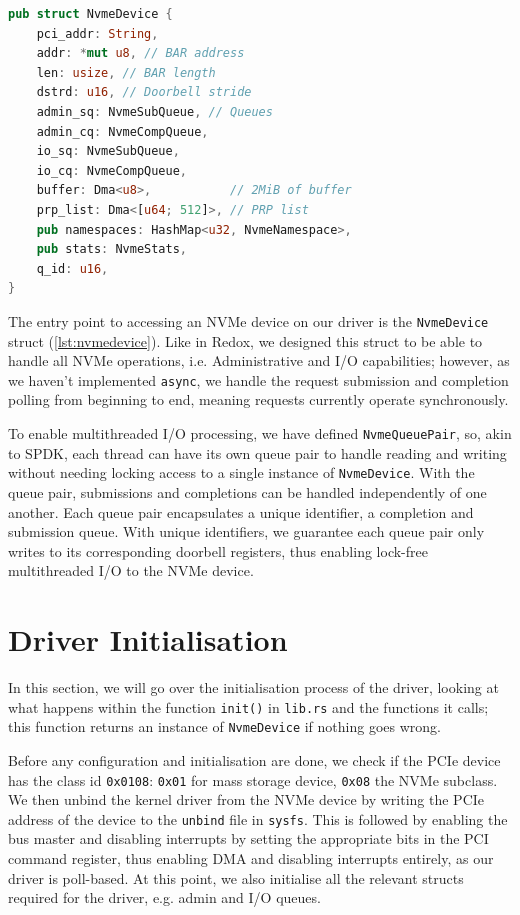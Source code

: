 \begin{lstlisting}[language=Rust,label=lst:nvmedevice,caption=NvmeDevice struct definition]
pub struct NvmeDevice {
    pci_addr: String,
    addr: *mut u8, // BAR address
    len: usize, // BAR length
    dstrd: u16, // Doorbell stride
    admin_sq: NvmeSubQueue, // Queues
    admin_cq: NvmeCompQueue,
    io_sq: NvmeSubQueue,
    io_cq: NvmeCompQueue,
    buffer: Dma<u8>,           // 2MiB of buffer
    prp_list: Dma<[u64; 512]>, // PRP list
    pub namespaces: HashMap<u32, NvmeNamespace>,
    pub stats: NvmeStats,
    q_id: u16,
}
\end{lstlisting}

The entry point to accessing an NVMe device on our driver is the \texttt{NvmeDevice} struct (\autoref{lst:nvmedevice}). Like in Redox, we designed this struct to be able to handle all NVMe operations, i.e. Administrative and I/O capabilities; however, as we haven't implemented \texttt{async}, we handle the request submission and completion polling from beginning to end, meaning requests currently operate synchronously.

To enable multithreaded I/O processing, we have defined \texttt{NvmeQueuePair}, so, akin to SPDK, each thread can have its own queue pair to handle reading and writing without needing locking access to a single instance of \texttt{NvmeDevice}. With the queue pair, submissions and completions can be handled independently of one another. Each queue pair encapsulates a unique identifier, a completion and submission queue. With unique identifiers, we guarantee each queue pair only writes to its corresponding doorbell registers, thus enabling lock-free multithreaded I/O to the NVMe device.

\section{Driver Initialisation}
In this section, we will go over the initialisation process of the driver, looking at what happens within the function \texttt{init()} in \texttt{lib.rs} and the functions it calls; this function returns an instance of \texttt{NvmeDevice} if nothing goes wrong.

Before any configuration and initialisation are done, we check if the PCIe device has the class id \texttt{0x0108}: \texttt{0x01} for mass storage device, \texttt{0x08} the NVMe subclass. We then unbind the kernel driver from the NVMe device by writing the PCIe address of the device to the \texttt{unbind} file in \texttt{sysfs}. This is followed by enabling the bus master and disabling interrupts by setting the appropriate bits in the PCI command register, thus enabling DMA and disabling interrupts entirely, as our driver is poll-based. At this point, we also initialise all the relevant structs required for the driver, e.g. admin and I/O queues.

